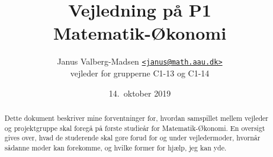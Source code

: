 \documentclass[12pt,a4paper,oneside,final]{article}
\title{
  Vejledning p{\aa} P1\\
  Matematik-{\O}konomi
}
\author{
  Janus Valberg-Madsen \href{mailto:janus@math.aau.dk}{\texttt{<janus@math.aau.dk>}}\\
  vejleder for grupperne C1-13 og C1-14
}
\date{14.\ oktober 2019}
\begin{document}
\maketitle

\renewcommand{\abstractname}{Om dette dokument}
\begin{abstract}
  Dette dokument beskriver mine forventninger for, hvordan samspillet mellem vejleder og projektgruppe skal foregå på første studieår for Matematik-Økonomi.
  En oversigt gives over, hvad de studerende skal gøre forud for og under vejledermøder, hvornår sådanne møder kan forekomme, og hvilke former for hjælp, jeg kan yde.
\end{abstract}








\end{document}
